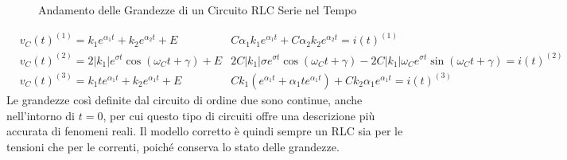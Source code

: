 \documentclass{article}
\numberwithin{equation}{subsection}
\begin{document}
\begin{figure}[ht]%
    \centering
    \qquad
    \caption{Andamento delle Grandezze di un Circuito RLC Serie nel Tempo}
    \label{fig:andamento-rlc-serie}
\end{figure}
\begin{align*}
    &v_C(t)^{(1)}=k_1e^{\alpha_1t}+k_2e^{\alpha_2t}+E     &C\alpha_1k_1e^{\alpha_1t}+C\alpha_2k_2e^{\alpha_2t}=i(t)^{(1)}\\
    &v_C(t)^{(2)}=2|k_1|e^{\sigma t}\cos(\omega_Ct+\gamma)+E     &2C|k_1|\sigma e^{\sigma t}\cos(\omega_Ct+\gamma)-2C|k_1|\omega_Ce^{\sigma t}\sin(\omega_Ct+\gamma)=i(t)^{(2)}\\
    &v_C(t)^{(3)}=k_1te^{\alpha_1t}+k_2e^{\alpha_1t}+E     &Ck_1(e^{\alpha_1t}+\alpha_1te^{\alpha_1t})+Ck_2\alpha_1e^{\alpha_1t}=i(t)^{(3)}
\end{align*}
Le grandezze così definite dal circuito di ordine due sono continue, anche nell'intorno di $t=0$, per cui questo tipo di circuiti offre una descrizione più accurata di 
fenomeni reali. Il modello corretto è quindi sempre un RLC sia per le tensioni che per le correnti, poiché conserva lo stato delle grandezze. 
\end{document}
